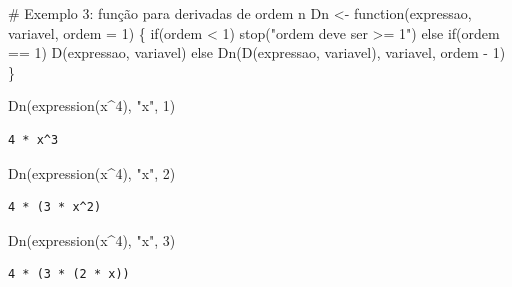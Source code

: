 \documentclass[
  letterpaper,
  DIV=11,
  numbers=noendperiod]{scrreprt}
\newenvironment{Shaded}{\begin{snugshade}}{\end{snugshade}}
\newcommand{\AttributeTok}[1]{\textcolor[rgb]{0.40,0.45,0.13}{#1}}
\newcommand{\CommentTok}[1]{\textcolor[rgb]{0.37,0.37,0.37}{#1}}
\newcommand{\ControlFlowTok}[1]{\textcolor[rgb]{0.00,0.23,0.31}{#1}}
\newcommand{\DecValTok}[1]{\textcolor[rgb]{0.68,0.00,0.00}{#1}}
\newcommand{\FunctionTok}[1]{\textcolor[rgb]{0.28,0.35,0.67}{#1}}
\newcommand{\NormalTok}[1]{\textcolor[rgb]{0.00,0.23,0.31}{#1}}
\newcommand{\OtherTok}[1]{\textcolor[rgb]{0.00,0.23,0.31}{#1}}
\newcommand{\SpecialCharTok}[1]{\textcolor[rgb]{0.37,0.37,0.37}{#1}}
\newcommand{\StringTok}[1]{\textcolor[rgb]{0.13,0.47,0.30}{#1}}
\begin{document}
\begin{Shaded}
\begin{Highlighting}[]
\CommentTok{\# Exemplo 3: função para derivadas de ordem n}
\NormalTok{Dn }\OtherTok{\textless{}{-}} \ControlFlowTok{function}\NormalTok{(expressao, variavel, }\AttributeTok{ordem =} \DecValTok{1}\NormalTok{) \{}
  \ControlFlowTok{if}\NormalTok{(ordem }\SpecialCharTok{\textless{}} \DecValTok{1}\NormalTok{) }\FunctionTok{stop}\NormalTok{(}\StringTok{"ordem deve ser \textgreater{}= 1"}\NormalTok{)}
  \ControlFlowTok{else} \ControlFlowTok{if}\NormalTok{(ordem }\SpecialCharTok{==} \DecValTok{1}\NormalTok{) }\FunctionTok{D}\NormalTok{(expressao, variavel)}
  \ControlFlowTok{else} \FunctionTok{Dn}\NormalTok{(}\FunctionTok{D}\NormalTok{(expressao, variavel), variavel, ordem }\SpecialCharTok{{-}} \DecValTok{1}\NormalTok{)}
\NormalTok{\}}

\FunctionTok{Dn}\NormalTok{(}\FunctionTok{expression}\NormalTok{(x}\SpecialCharTok{\^{}}\DecValTok{4}\NormalTok{), }\StringTok{"x"}\NormalTok{, }\DecValTok{1}\NormalTok{)}
\end{Highlighting}
\end{Shaded}

\begin{verbatim}
4 * x^3
\end{verbatim}

\begin{Shaded}
\begin{Highlighting}[]
\FunctionTok{Dn}\NormalTok{(}\FunctionTok{expression}\NormalTok{(x}\SpecialCharTok{\^{}}\DecValTok{4}\NormalTok{), }\StringTok{"x"}\NormalTok{, }\DecValTok{2}\NormalTok{)}
\end{Highlighting}
\end{Shaded}

\begin{verbatim}
4 * (3 * x^2)
\end{verbatim}

\begin{Shaded}
\begin{Highlighting}[]
\FunctionTok{Dn}\NormalTok{(}\FunctionTok{expression}\NormalTok{(x}\SpecialCharTok{\^{}}\DecValTok{4}\NormalTok{), }\StringTok{"x"}\NormalTok{, }\DecValTok{3}\NormalTok{)}
\end{Highlighting}
\end{Shaded}

\begin{verbatim}
4 * (3 * (2 * x))
\end{verbatim}
\end{document}
